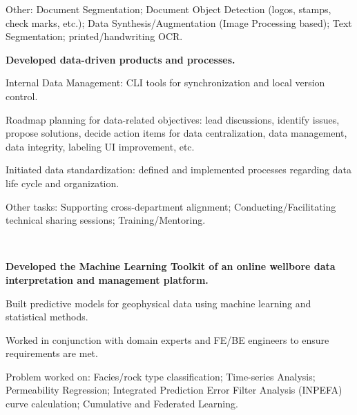 \begin{xitemize}
\begin{zitemize}
        \item Other: Document Segmentation; Document Object Detection (logos, stamps, check marks, etc.);
        Data Synthesis/Augmentation (Image Processing based); Text Segmentation;
        printed/handwriting OCR.
    \end{zitemize}
    \item \textbf{Developed data-driven products and processes.}
    \begin{zitemize}
        \item Internal Data Management: CLI tools for synchronization and local version control.
        \item Roadmap planning for data-related objectives: lead discussions, identify issues, propose solutions, decide action items for data centralization, data management, data integrity, labeling UI improvement, etc.
        \item Initiated data standardization: defined and implemented processes regarding data life cycle and organization.
    \end{zitemize}
    \item Other tasks: Supporting cross-department alignment; Conducting/Facilitating technical sharing sessions; Training/Mentoring.
\end{xitemize}

\\
\begin{xitemize}
    \item \textbf{Developed the Machine Learning Toolkit of an online wellbore data interpretation and management platform.}
    \begin{zitemize}
        \item Built predictive models for geophysical data using machine learning and statistical methods.
        \item Worked in conjunction with domain experts and FE/BE engineers to ensure requirements are met.
        \item Problem worked on: Facies/rock type classification; Time-series Analysis; Permeability Regression; Integrated Prediction Error Filter Analysis (INPEFA) curve calculation; Cumulative and Federated Learning.
    \end{zitemize}
\end{xitemize}

